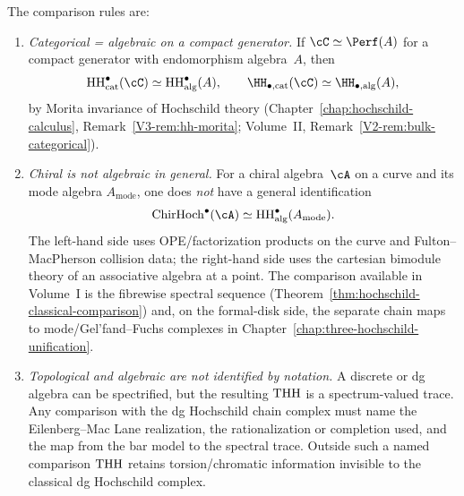 \begin{proposition}
\smallskip\noindent
The comparison rules are:
\begin{enumerate}[label=\textup{(\alph*)}]
\item \emph{Categorical = algebraic on a compact generator.}
 If $\cC \simeq \Perf(A)$ for a compact generator with endomorphism
 algebra~$A$, then
 \[
 \HHcat^\bullet(\cC) \simeq \HHalg^\bullet(A),
 \qquad
 \HH_{\bullet,\mathrm{cat}}(\cC) \simeq \HH_{\bullet,\mathrm{alg}}(A),
 \]
 by Morita invariance of Hochschild theory
 \textup{(}Chapter~\textup{\ref{chap:hochschild-calculus}},
 Remark~\textup{\ref{V3-rem:hh-morita}};
 Volume~II, Remark~\textup{\ref{V2-rem:bulk-categorical}}\textup{)}.

\item \emph{Chiral is not algebraic in general.}
 For a chiral algebra~$\cA$ on a curve and its mode algebra
 $A_{\mathrm{mode}}$, one does \emph{not} have a general
 identification
 \[
 \ChirHoch^\bullet(\cA) \simeq \HHalg^\bullet(A_{\mathrm{mode}}).
 \]
 The left-hand side uses OPE/factorization products on the curve and
 Fulton--MacPherson collision data; the right-hand side uses the
 cartesian bimodule theory of an associative algebra at a point.
 The comparison available in Volume~I is the fibrewise spectral
 sequence
 \textup{(}Theorem~\textup{\ref{thm:hochschild-classical-comparison}}\textup{)}
 and, on the formal-disk side, the separate chain maps to
 mode/Gel'fand--Fuchs complexes in
 Chapter~\textup{\ref{chap:three-hochschild-unification}}.

\item \emph{Topological and algebraic are not identified by notation.}
 A discrete or dg algebra can be spectrified, but the resulting
 $\mathrm{THH}$ is a spectrum-valued trace. Any comparison with the dg
 Hochschild chain complex must name the Eilenberg--Mac Lane
 realization, the rationalization or completion used, and the map from
 the bar model to the spectral trace. Outside such a named comparison
 $\mathrm{THH}$ retains torsion/chromatic information invisible to the
 classical dg Hochschild complex.
\end{enumerate}
\end{proposition}

